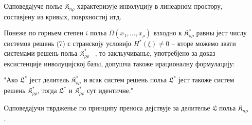 ﻿\documentclass[11pt]{article}
\providecommand{\Kfield}{\mathfrak{K}}
\begin{document}
Одповедајуче полье $\Kfield_{n\rho}$ характеризује инволуцију в линеарном простору, составјену из кривых, поврхностиј итд.

Понеже по горньем степен $i$ польа $\Omega(x_1,\ldots,x_\rho)$ взходно к $\Kfield^*_{\rho\rho}$ равны јест числу системов решень (7) с странскоју условијо $H^*(\xi)\ne0$ -- кторе можемо звати системами решень польа $\Kfield^*_{\rho\rho}$ --, то закльучиванье, употребјено за доказ ексистенције инволуцијској базы, допушча такоже ирационалну формулацију:

"Ако $\mathfrak{L}^*$ јест делитель $\Kfield^*_{\rho\rho}$ и всак систем решень польа $\mathfrak{L}^*$ јест такоже систем решень $\Kfield^*_{\rho\rho}$, тогда $\mathfrak{L}^*$ и $\Kfield^*_{\rho\rho}$ сут идентичне."

Одповедајучи тврдженье по принципу преноса дејствује за делителье $\mathfrak{L}$ польа $\Kfield_{n\rho}$.
\end{document}
